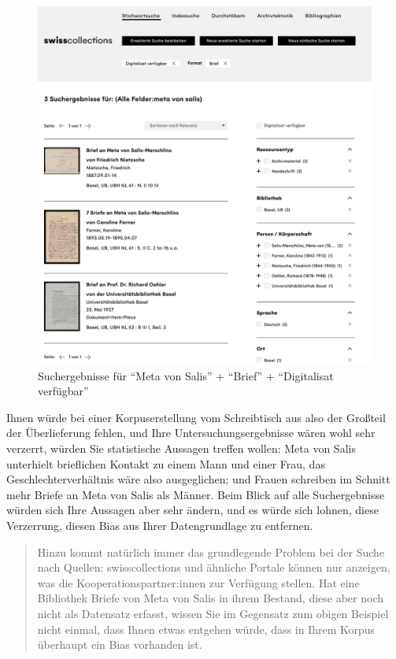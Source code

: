 \documentclass[
  letterpaper,
]{book}
\begin{document}
\begin{figure}

{\centering \includegraphics{./_book/images/suchergebnisse_2.png}

}

\caption{Suchergebnisse für ``Meta von Salis'' + ``Brief'' +
``Digitalisat verfügbar''}

\end{figure}

Ihnen würde bei einer Korpuserstellung vom Schreibtisch aus also der
Großteil der Überlieferung fehlen, und Ihre Untersuchungsergebnisse
wären wohl sehr verzerrt, würden Sie statistische Aussagen treffen
wollen: Meta von Salis unterhielt brieflichen Kontakt zu einem Mann und
einer Frau, das Geschlechterverhältnis wäre also ausgeglichen; und
Frauen schreiben im Schnitt mehr Briefe an Meta von Salis als Männer.
Beim Blick auf alle Suchergebnisse würden sich Ihre Aussagen aber sehr
ändern, und es würde sich lohnen, diese Verzerrung, diesen Bias aus
Ihrer Datengrundlage zu entfernen.

\begin{quote}
Hinzu kommt natürlich immer das grundlegende Problem bei der Suche nach
Quellen: swisscollections und ähnliche Portale können nur anzeigen, was
die Kooperationspartner:innen zur Verfügung stellen. Hat eine Bibliothek
Briefe von Meta von Salis in ihrem Bestand, diese aber noch nicht als
Datensatz erfasst, wissen Sie im Gegensatz zum obigen Beispiel nicht
einmal, dass Ihnen etwas entgehen würde, dass in Ihrem Korpus überhaupt
ein Bias vorhanden ist.
\end{quote}
\end{document}
